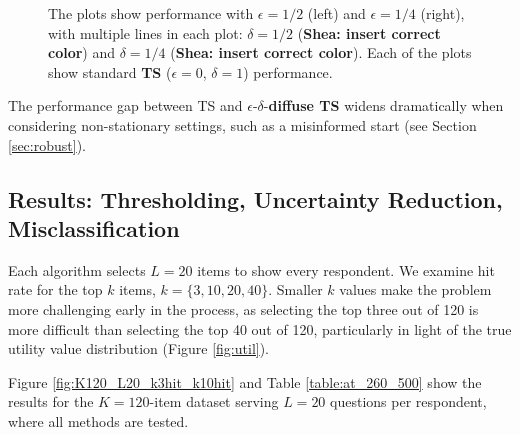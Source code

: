 \documentclass[a4paper,11pt]{article}
\newcommand{\ts}{\textbf{TS} }
\newcommand{\edts}{$\epsilon$-$\delta$-\textbf{diffuse TS} }
\newcommand{\numperset}{L}
\begin{document}
\begin{figure}
\caption{The plots show performance with $\epsilon = 1/2$ (left) and $\epsilon = 1/4$ (right), with multiple lines in each plot: $\delta = 1/2$ (\textbf{Shea: insert correct color}) and $\delta = 1/4$ (\textbf{Shea: insert correct color}). Each of the plots show standard \ts ($\epsilon = 0$, $\delta =1$) performance.}

\label{fig:effects_epsilon_delta}
 	\begin{center}
    \qquad
    \end{center}
\end{figure}

The performance gap between TS and \edts widens dramatically when considering non-stationary settings, such as a misinformed start (see Section \ref{sec:robust}). 

\subsection{Results: Thresholding, Uncertainty Reduction, Misclassification}

Each algorithm selects $\numperset=20$ items to show every respondent. We examine hit rate for the top $k$ items, $k = \{3,10,20,40\}$. Smaller $k$ values make the problem more challenging early in the process, as selecting the top three out of 120 is more difficult than selecting the top 40 out of 120, particularly in light of the true utility value distribution (Figure \ref{fig:util}).  


Figure \ref{fig:K120_L20_k3hit_k10hit} and Table \ref{table:at_260_500} show the results for the $K=120$-item dataset serving $\numperset=20$ questions per respondent, where all methods are tested.
\end{document}
